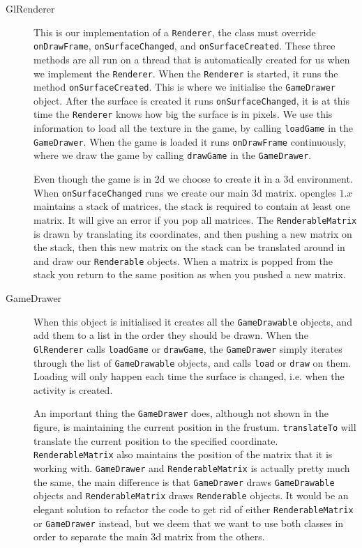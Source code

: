 \begin{description}

\item[GlRenderer] This is our implementation of a \lstinline|Renderer|, the class must override \lstinline|onDrawFrame|, \lstinline|onSurfaceChanged|, and \lstinline|onSurfaceCreated|. These three methods are all run on a thread that is automatically created for us when we implement the \lstinline|Renderer|.  When the \lstinline|Renderer| is started, it runs the method \lstinline|onSurfaceCreated|. This is where we initialise the \lstinline|GameDrawer| object. After the surface is created it runs \lstinline|onSurfaceChanged|, it is at this time the \lstinline|Renderer| knows how big the surface is in pixels. We use this information to load all the texture in the game, by calling \lstinline|loadGame| in the \lstinline|GameDrawer|. When the game is loaded it runs \lstinline|onDrawFrame| continuously, where we draw the game by calling \lstinline|drawGame| in the \lstinline|GameDrawer|.

Even though the game is in \ac{2d} we choose to create it in a \ac{3d} environment. When \lstinline|onSurfaceChanged| runs we create our main \ac{3d} matrix. \ac{opengles} $1.x$ maintains a stack of matrices, the stack is required to contain at least one matrix. It will give an error if you pop all matrices. The \lstinline|RenderableMatrix| is drawn by translating its coordinates, and then pushing a new matrix on the stack, then this new matrix on the stack can be translated around in and draw our \lstinline|Renderable| objects. When a matrix is popped from the stack you return to the same position as when you pushed a new matrix.\citep{openglspecs}

\item[GameDrawer] When this object is initialised it creates all the \lstinline|GameDrawable| objects, and add them to a list in the order they should be drawn. When the \lstinline|GlRenderer| calls \lstinline|loadGame| or \lstinline|drawGame|, the \lstinline|GameDrawer| simply iterates through the list of \lstinline|GameDrawable| objects, and calls \lstinline|load| or \lstinline|draw| on them. Loading will only happen each time the surface is changed, i.e. when the activity is created.

An important thing the \lstinline|GameDrawer| does, although not shown in the figure, is maintaining the current position in the frustum. \lstinline|translateTo| will translate the current position to the specified coordinate. \lstinline|RenderableMatrix| also maintains the position of the matrix that it is working with. \lstinline|GameDrawer| and \lstinline|RenderableMatrix| is actually pretty much the same, the main difference is that \lstinline|GameDrawer| draws \lstinline|GameDrawable| objects and \lstinline|RenderableMatrix| draws \lstinline|Renderable| objects. It would be an elegant solution to refactor the code to get rid of either \lstinline|RenderableMatrix| or \lstinline|GameDrawer| instead, but we deem that we want to use both classes in order to separate the main \ac{3d} matrix from the others.


\end{description}
